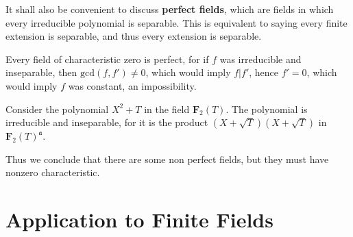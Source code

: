 It shall also be convenient to discuss {\bf perfect fields}, which are fields in which every irreducible polynomial is separable. This is equivalent to saying every finite extension is separable, and thus every extension is separable.

\begin{example}
    Every field of characteristic zero is perfect, for if $f$ was irreducible and inseparable, then $\text{gcd}(f, f') \neq 0$, which would imply $f | f'$, hence $f' = 0$, which would imply $f$ was constant, an impossibility.
\end{example}

\begin{example}
    Consider the polynomial $X^2 + T$ in the field $\mathbf{F}_2(T)$. The polynomial is irreducible and inseparable, for it is the product $(X + \sqrt{T})(X + \sqrt{T})$ in $\mathbf{F}_2(T)^{\mathfrak{a}}$.
\end{example}

Thus we conclude that there are some non perfect fields, but they must have nonzero characteristic.






\section{Application to Finite Fields}

